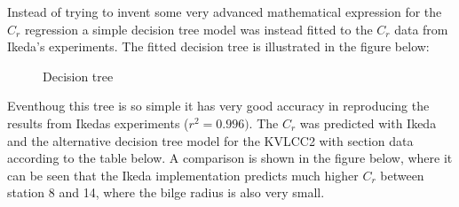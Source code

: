     

    Instead of trying to invent some very advanced mathematical expression
for the \(C_r\) regression a simple decision tree model was instead
fitted to the \(C_r\) data from Ikeda's experiments. The fitted decision
tree is illustrated in the figure below:

    \begin{figure}
        \begin{center}\end{center}
        \caption{Decision tree}
        \label{fig:decision_tree}
    \end{figure}
    
    Eventhoug this tree is so simple it has very good accuracy in
reproducing the results from Ikedas experiments (\(r^2=0.996)\). The
\(C_r\) was predicted with Ikeda and the alternative decision tree model
for the KVLCC2 with section data according to the table below. A
comparison is shown in the figure below, where it can be seen that the
Ikeda implementation predicts much higher \(C_r\) between station 8 and
14, where the bilge radius is also very small.
 
            
    
